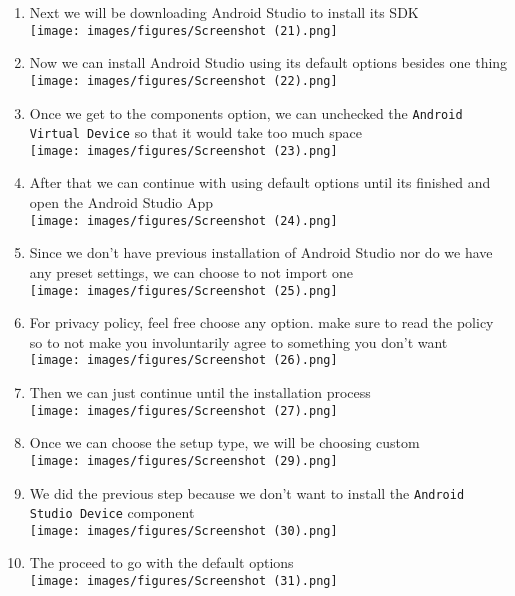 \documentclass[12pt,titlepage]{article}
\begin{document}
\begin{enumerate}
    \newpage
    \item Next we will be downloading Android Studio to install its SDK \\ \texttt{[image: images/figures/Screenshot (21).png]}
    \item Now we can install Android Studio using its default options besides one thing \\ \texttt{[image: images/figures/Screenshot (22).png]}
    \newpage
    \item Once we get to the components option, we can unchecked the \texttt{Android Virtual Device} so that it would take too much space \\ \texttt{[image: images/figures/Screenshot (23).png]}
    \item After that we can continue with using default options until its finished and open the Android Studio App \\ \texttt{[image: images/figures/Screenshot (24).png]}
    \newpage
    \item Since we don't have previous installation of Android Studio nor do we have any preset settings, we can choose to not import one \\ \texttt{[image: images/figures/Screenshot (25).png]}
    \item For privacy policy, feel free choose any option. make sure to read the policy so to not make you involuntarily agree to something you don't want \\ \texttt{[image: images/figures/Screenshot (26).png]}
    \newpage
    \item Then we can just continue until the installation process \\ \texttt{[image: images/figures/Screenshot (27).png]}
    \item Once we can choose the setup type, we will be choosing custom \\ \texttt{[image: images/figures/Screenshot (29).png]}
    \newpage
    \item We did the previous step because we don't want to install the \texttt{Android Studio Device} component \\ \texttt{[image: images/figures/Screenshot (30).png]}
    \item The proceed to go with the default options \\ \texttt{[image: images/figures/Screenshot (31).png]}

\end{enumerate}
\end{document}
